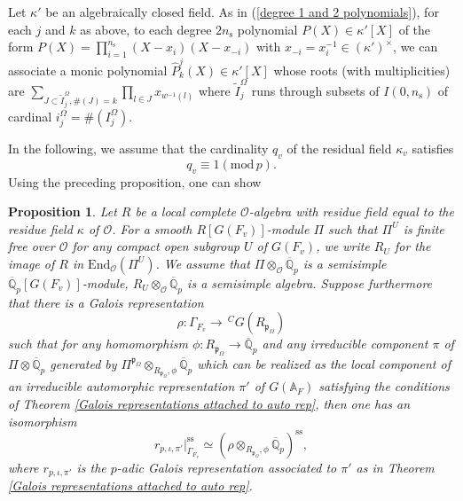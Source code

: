 \documentclass[12pt,oneside,reqno]{amsart}
\theoremstyle{plain}
\newtheorem{proposition}[theorem]{Proposition}
\begin{document}
	Let $\kappa'$ be an algebraically closed field.
	As in
	(\ref{degree 1 and 2 polynomials}),
	for each $j$ and $k$ as above,
	to each degree
	$2n_\mathrm{s}$ polynomial
	$P(X)
	\in\kappa'[X]$
	of the form
	$P(X)
	=\prod_{i=1}^{n_\mathrm{s}}
	(X-x_i)(X-x_{-i})$
	with $x_{-i}=x_i^{-1}\in(\kappa')^\times$,
	we can associate a monic polynomial
	$\widehat{P}_k^j(X)
	\in
	\kappa'[X]$
	whose roots
	(with multiplicities)
	are
	$\sum_{J\subset \widetilde{I}^\Omega_j,\# (J)=k}
	\prod_{l\in J}x_{w^{-1}(l)}$
	where
	$\widetilde{I}_j^\Omega$
	runs through subsets of
	$I(0,n_\mathrm{s})$
	of cardinal $i_j^\Omega=\# (I_j^\Omega)$.
	
	
	In the following, we assume that the cardinality $q_v$ of
	the residual field $\kappa_v$
	satisfies
	\[
	q_v\equiv1(\mathrm{mod}\,p).
	\]
	Using the preceding proposition, one can show
	\begin{proposition}\label{projector induces an isomorphism}
		Let $R$ be a local complete $\mathcal{O}$-algebra with residue field equal to the residue field $\kappa$ of $\mathcal{O}$.	For a smooth $R[ G(F_v)]$-module $\Pi$ such that	$\Pi^U$ is finite free over $\mathcal{O}$
		for any compact open subgroup $U$ of $ G(F_v)$, we write $R_U$ for the image of $R$ in $\mathrm{End}_\mathcal{O}(\Pi^U)$. We assume that
		$\Pi\otimes_\mathcal{O}\overline{\mathbb{Q}}_p$ is a semisimple
		$\overline{\mathbb{Q}}_p[ G(F_v)]$-module,	$R_U\otimes_\mathcal{O}\overline{\mathbb{Q}}_p$ is a semisimple algebra.
		Suppose furthermore that there is a Galois representation
		\[
		\rho
		\colon
		\Gamma_{F_v}
		\rightarrow
		\,^CG\left(R_{\mathfrak{p}_\Omega}\right)
		\]
		such that for any homomorphism $\phi\colon R_{\mathfrak{p}_\Omega}
		\rightarrow\overline{\mathbb{Q}}_p$	and any	irreducible component
		$\pi$ of $\Pi\otimes\overline{\mathbb{Q}}_p$ generated by
		$\Pi^{\mathfrak{p}_\Omega}\otimes_{R_{\mathfrak{p}_\Omega},\phi}
		\overline{\mathbb{Q}}_p$ which can be realized as the local component of
		an irreducible automorphic representation $\pi'$ of $G(\mathbb{A}_F)$
		satisfying the conditions of Theorem \ref{Galois representations attached to auto rep}, then one has an isomorphism
		\[
		r_{p,\iota,\pi'}|_{\Gamma_{F_v}}^\mathrm{ss}
		\simeq
		(
		\rho
		\otimes_{R_{\mathfrak{p}_\Omega},\phi}
		\overline{\mathbb{Q}}_p
		)^\mathrm{ss},
		\]
		where $r_{p,\iota,\pi'}$ is the $p$-adic Galois representation associated to
		$\pi'$ as in Theorem \ref{Galois representations attached to auto rep}.
		
		
		
		
		

\end{proposition}
\end{document}
